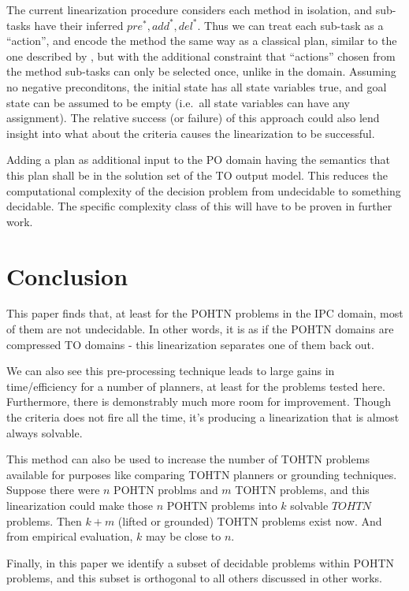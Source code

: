 \documentclass[letterpaper]{article} %
\newcommand{\PreS} {\ensuremath{\mathit{pre^{*}}}}
\newcommand{\AddS} {\ensuremath{\mathit{add^{*}}}}
\newcommand{\DelS} {\ensuremath{\mathit{del^{*}}}}
\begin{document}
The current linearization procedure considers each method in isolation, and sub-tasks have their inferred $\PreS, \AddS, \DelS$. Thus we can treat each sub-task as a \enquote{action}, and encode the method the same way as a classical plan, similar to the one described by \cite{RINTANEN201245}, but with the additional constraint that \enquote{actions} chosen from the method sub-tasks can only be selected once, unlike in the domain. Assuming no negative preconditons, the initial state has all state variables true, and goal state can be assumed to be empty (i.e.\ all state variables can have any assignment). The relative success (or failure) of this approach could also lend insight into what about the criteria causes the linearization to be successful.


Adding a plan as additional input to the PO domain having the
semantics that this plan shall be in the solution set of the TO output
model. This reduces the computational complexity of the decision problem from undecidable to something decidable. The specific complexity class of this will have to be proven in further work.  %





\section{Conclusion}


This paper finds that, at least for the POHTN problems in the IPC domain, most of them are not undecidable. In other words, it is as if the POHTN domains are compressed TO domains - this linearization separates one of them back out.

We can also see this pre-processing technique leads to large gains in time/efficiency for a number of planners, at least for the problems tested here. Furthermore, there is demonstrably much more room for improvement. Though the criteria does not fire all the time, it's producing a linearization that is almost always solvable.

This method can also be used to increase the number of TOHTN problems available for purposes like comparing TOHTN planners or grounding techniques. Suppose there were $n$ POHTN problms and $m$ TOHTN problems, and this linearization could make those $n$ POHTN problems into $k$ solvable $TOHTN$ problems. Then $k+m$ (lifted or grounded) TOHTN problems exist now. And from empirical evaluation, $k$ may be close to $n$.

Finally, in this paper we identify a subset of decidable problems within POHTN problems, and this subset is orthogonal to all others discussed in other works.







\end{document}
